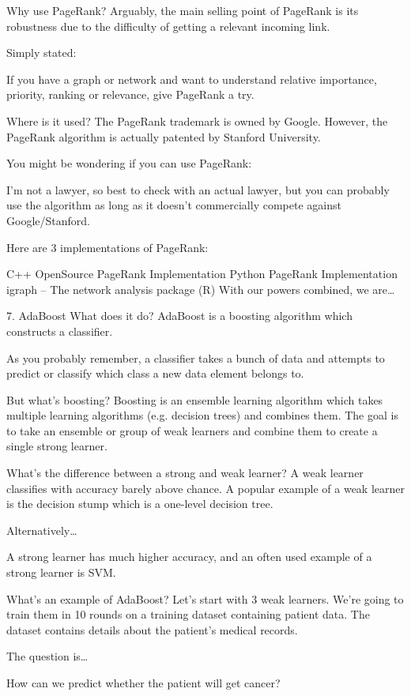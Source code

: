 Why use PageRank? Arguably, the main selling point of PageRank  is its robustness due to the difficulty of getting a relevant incoming link.

Simply stated:

If you have a graph or network and want to understand relative importance, priority, ranking or relevance, give PageRank a try.

Where is it used? The PageRank trademark is owned by Google. However, the PageRank algorithm is actually patented by Stanford University.

You might be wondering if you can use PageRank:

I’m not a lawyer, so best to check with an actual lawyer, but you can probably use the algorithm as long as it doesn’t commercially compete against Google/Stanford.

Here are 3 implementations of PageRank:

C++ OpenSource PageRank Implementation
Python PageRank Implementation
igraph – The network analysis package (R)
With our powers combined, we are…

7. AdaBoost
What does it do? AdaBoost is a boosting algorithm which constructs a classifier.

As you probably remember, a classifier takes a bunch of data and attempts to predict or classify which class a new data element  belongs to.

But what’s boosting? Boosting is an ensemble learning algorithm which takes multiple learning algorithms (e.g. decision trees) and combines them. The goal is to take an ensemble or group of weak learners and combine them to create a single strong learner.

What’s the difference between a strong and weak learner? A weak learner classifies with accuracy barely above chance. A popular example of a weak learner is the decision stump which is a one-level decision tree.

Alternatively…

A strong learner has much higher accuracy, and an often used example of a strong learner is SVM.

What’s an example of AdaBoost? Let’s start with 3 weak learners. We’re going to train them in 10 rounds on a training dataset containing patient data. The dataset contains details about the patient’s medical records.

The question is…

How can we predict whether the patient will get cancer?

